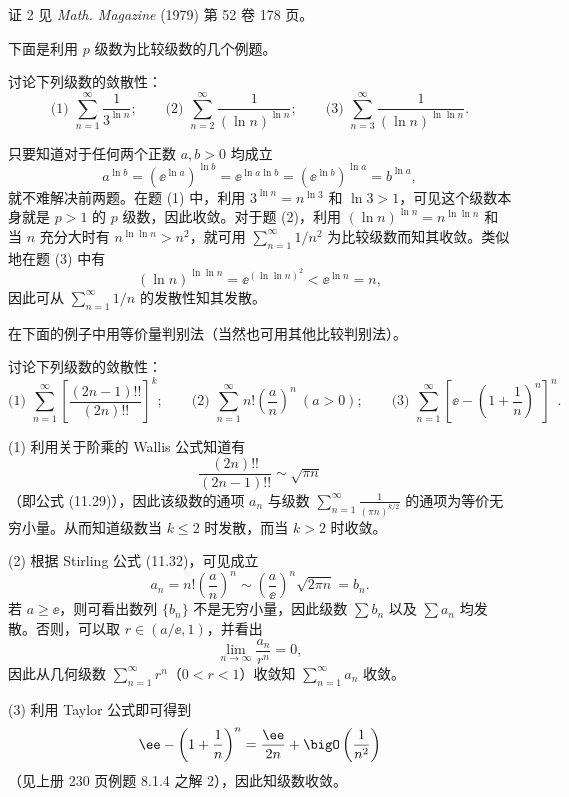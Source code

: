 \begin{xremark}
证 2 见 \textit{Math. Magazine} (1979) 第 52 卷 178 页。
\end{xremark}

下面是利用 $p$ 级数为比较级数的几个例题。

\begin{xexample}[13.2.2]
讨论下列级数的敛散性：
\[
\text{(1) }\sum_{n=1}^{\infty}\frac1{3^{\ln n}};\qquad
\text{(2) }\sum_{n=2}^{\infty}\frac1{(\ln n)^{\ln n}};\qquad
\text{(3) }\sum_{n=3}^{\infty}\frac1{(\ln n)^{\ln\ln n}}.
\]
\end{xexample}
\begin{xsolution}
只要知道对于任何两个正数 $a,b>0$ 均成立
\[
a^{\ln b}=(\ee^{\ln a})^{\ln b}=\ee^{\ln a\ln b}=(\ee^{\ln b})^{\ln a}=b^{\ln a},
\]
就不难解决前两题。在题 (1) 中，利用 $3^{\ln n}=n^{\ln3}$ 和 $\ln3>1$，可见这个级数本身就是 $p>1$ 的 $p$ 级数，因此收敛。对于题 (2)，利用 $(\ln n)^{\ln n}=n^{\ln\ln n}$ 和当 $n$ 充分大时有 $n^{\ln\ln n}>n^2$，就可用 $\sum_{n=1}^{\infty}1/n^2$ 为比较级数而知其收敛。类似地在题 (3) 中有
\[
(\ln n)^{\ln\ln n}=\ee^{(\ln\ln n)^2}<\ee^{\ln n}=n,
\]
因此可从 $\sum_{n=1}^{\infty}1/n$ 的发散性知其发散。
\end{xsolution}

在下面的例子中用等价量判别法（当然也可用其他比较判别法）。

\begin{xexample}[13.2.3]
讨论下列级数的敛散性：
\[
\text{(1) }\sum_{n=1}^{\infty}\left[\frac{(2n-1)!!}{(2n)!!}\right]^k;\qquad
\text{(2) }\sum_{n=1}^{\infty}n!\left(\frac an\right)^n\ (a>0);\qquad
\text{(3) }\sum_{n=1}^{\infty}\left[\ee-\left(1+\frac1n\right)^n\right]^n.
\]
\end{xexample}
\begin{xsolution}
(1) 利用关于阶乘的 Wallis 公式知道有
\[
\frac{(2n)!!}{(2n-1)!!}\sim\sqrt{\pi n}
\]
（即公式 (11.29)），因此该级数的通项 $a_n$ 与级数 $\sum_{n=1}^{\infty}\frac1{(\pi n)^{k/2}}$ 的通项为等价无穷小量。从而知道级数当 $k\leq2$ 时发散，而当 $k>2$ 时收敛。

(2) 根据 Stirling 公式 (11.32)，可见成立
\[
a_n=n!\left(\frac an\right)^n\sim\left(\frac a\ee\right)^n\sqrt{2\pi n}=b_n.
\]
若 $a\geq\ee$，则可看出数列 $\{b_n\}$ 不是无穷小量，因此级数 $\sum b_n$ 以及 $\sum a_n$ 均发散。否则，可以取 $r\in(a/\ee,1)$，并看出
\[
\lim_{n\to\infty}\frac{a_n}{r^n}=0,
\]
因此从几何级数 $\sum_{n=1}^{\infty}r^n$（$0<r<1$）收敛知 $\sum_{n=1}^{\infty}a_n$ 收敛。

(3) 利用 Taylor 公式即可得到
\[
\ee-\left(1+\frac1n\right)^n=\frac{\ee}{2n}+\bigO\left(\frac1{n^2}\right)
\]
（见上册 230 页例题 8.1.4 之解 2），因此知级数收敛。
\end{xsolution}

